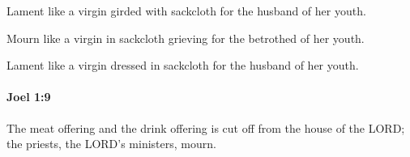 			\begin{versebox}
					\item[BHS] 
					\item[LXX] 
					\item[ASV] Lament like a virgin girded with sackcloth for the husband of her youth.
					\item[NIV] Mourn like a virgin in sackcloth grieving for the betrothed of her youth.
					\item[NRSV] Lament like a virgin dressed in sackcloth for the husband of her youth.
			\end{versebox}

		\paragraph{Joel 1:9} %
			\label{JOEL-1-9}

			The meat offering and the drink offering is cut off from the house of the LORD; the priests, the LORD’s ministers, mourn.

